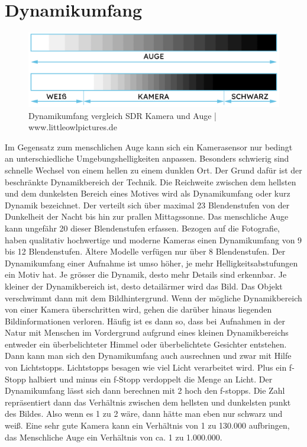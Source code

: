 \documentclass[conference]{IEEEtran}
\begin{document}
\section{Dynamikumfang}
\begin{figure}[H]
	\centering
	\includegraphics[scale=0.11]{img/dynamikumfang.png}
	\caption{Dynamikumfang vergleich SDR Kamera und Auge | www.littleowlpictures.de}
	\label{fig}
\end{figure}
Im Gegensatz zum menschlichen Auge kann sich ein Kamerasensor nur bedingt an unterschiedliche Umgebungshelligkeiten anpassen. Besonders schwierig sind schnelle Wechsel von einem hellen zu einem dunklen Ort. Der Grund dafür ist der beschränkte Dynamikbereich der Technik.
Die Reichweite zwischen dem hellsten und dem dunkelsten Bereich eines Motives wird als Dynamikumfang oder kurz Dynamik bezeichnet. Der verteilt sich über maximal 23 Blendenstufen von der Dunkelheit der Nacht bis hin zur prallen Mittagssonne. Das menschliche Auge kann ungefähr 20 dieser Blendenstufen erfassen. Bezogen auf die Fotografie, haben qualitativ hochwertige und moderne Kameras einen Dynamikumfang von 9 bis 12 Blendenstufen. Ältere Modelle verfügen nur über 8 Blendenstufen.
Der Dynamikumfang einer Aufnahme ist umso höher, je mehr Helligkeitsabstufungen ein Motiv hat. Je grösser die Dynamik, desto mehr Details sind erkennbar. Je kleiner der Dynamikbereich ist, desto detailärmer wird das Bild. Das Objekt verschwimmt dann mit dem Bildhintergrund.
Wenn der mögliche Dynamikbereich von einer Kamera überschritten wird, gehen die darüber hinaus liegenden Bildinformationen verloren. Häufig ist es dann so, dass bei Aufnahmen in der Natur mit Menschen im Vordergrund aufgrund eines kleinen Dynamikbereichs entweder ein überbelichteter Himmel oder überbelichtete Gesichter entstehen. 
Dann kann man sich den Dynamikumfang auch ausrechnen und zwar mit Hilfe von Lichtstopps. Lichtstopps besagen wie viel Licht verarbeitet wird. Plus ein f-Stopp halbiert und minus ein f-Stopp verdoppelt die Menge an Licht. Der Dynamikumfang lässt sich dann berechnen mit 2 hoch den f-stopps. Die Zahl repräsentiert dann das Verhältnis zwischen dem hellsten und dunkelsten punkt des Bildes. Also wenn es 1 zu 2 wäre, dann hätte man eben nur schwarz und weiß. Eine sehr gute Kamera kann ein Verhältnis von 1 zu 130.000 aufbringen, das Menschliche Auge ein Verhältnis von ca. 1 zu 1.000.000.
\end{document}
